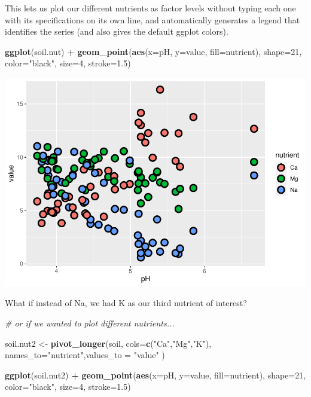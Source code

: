 \documentclass[
]{article}
\newenvironment{Shaded}{\begin{snugshade}}{\end{snugshade}}
\newcommand{\AttributeTok}[1]{\textcolor[rgb]{0.13,0.29,0.53}{#1}}
\newcommand{\CommentTok}[1]{\textcolor[rgb]{0.56,0.35,0.01}{\textit{#1}}}
\newcommand{\DecValTok}[1]{\textcolor[rgb]{0.00,0.00,0.81}{#1}}
\newcommand{\FloatTok}[1]{\textcolor[rgb]{0.00,0.00,0.81}{#1}}
\newcommand{\FunctionTok}[1]{\textcolor[rgb]{0.13,0.29,0.53}{\textbf{#1}}}
\newcommand{\NormalTok}[1]{#1}
\newcommand{\OtherTok}[1]{\textcolor[rgb]{0.56,0.35,0.01}{#1}}
\newcommand{\SpecialCharTok}[1]{\textcolor[rgb]{0.81,0.36,0.00}{\textbf{#1}}}
\newcommand{\StringTok}[1]{\textcolor[rgb]{0.31,0.60,0.02}{#1}}
\begin{document}
This lets us plot our different nutrients as factor levels without
typing each one with its specifications on its own line, and
automatically generates a legend that identifies the series (and also
gives the default ggplot colors).

\begin{Shaded}
\begin{Highlighting}[]
\FunctionTok{ggplot}\NormalTok{(soil.nut) }\SpecialCharTok{+}
  \FunctionTok{geom\_point}\NormalTok{(}\FunctionTok{aes}\NormalTok{(}\AttributeTok{x=}\NormalTok{pH, }\AttributeTok{y=}\NormalTok{value, }\AttributeTok{fill=}\NormalTok{nutrient), }\AttributeTok{shape=}\DecValTok{21}\NormalTok{, }\AttributeTok{color=}\StringTok{"black"}\NormalTok{, }\AttributeTok{size=}\DecValTok{4}\NormalTok{, }\AttributeTok{stroke=}\FloatTok{1.5}\NormalTok{)}
\end{Highlighting}
\end{Shaded}

\includegraphics{module1_3_files/figure-latex/unnamed-chunk-30-1.pdf}

What if instead of Na, we had K as our third nutrient of interest?

\begin{Shaded}
\begin{Highlighting}[]
\CommentTok{\# or if we wanted to plot different nutrients...}

\NormalTok{soil.nut2 }\OtherTok{\textless{}{-}} \FunctionTok{pivot\_longer}\NormalTok{(soil, }\AttributeTok{cols=}\FunctionTok{c}\NormalTok{(}\StringTok{"Ca"}\NormalTok{,}\StringTok{"Mg"}\NormalTok{,}\StringTok{"K"}\NormalTok{), }\AttributeTok{names\_to=}\StringTok{"nutrient"}\NormalTok{,}\AttributeTok{values\_to =} \StringTok{"value"}\NormalTok{ )}

\FunctionTok{ggplot}\NormalTok{(soil.nut2) }\SpecialCharTok{+}
  \FunctionTok{geom\_point}\NormalTok{(}\FunctionTok{aes}\NormalTok{(}\AttributeTok{x=}\NormalTok{pH, }\AttributeTok{y=}\NormalTok{value, }\AttributeTok{fill=}\NormalTok{nutrient), }\AttributeTok{shape=}\DecValTok{21}\NormalTok{, }\AttributeTok{color=}\StringTok{"black"}\NormalTok{, }\AttributeTok{size=}\DecValTok{4}\NormalTok{, }\AttributeTok{stroke=}\FloatTok{1.5}\NormalTok{)}
\end{Highlighting}
\end{Shaded}
\end{document}
